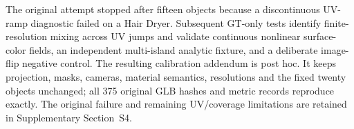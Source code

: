 \documentclass[times,twocolumn,final]{elsarticle}
\providecommand{\DIFadd}[1]{{\protect\color{blue} \sf #1}} %
\providecommand{\DIFaddbegin}{} %
\providecommand{\DIFaddend}{} %
\providecommand{\DIFdelbegin}{} %
\providecommand{\DIFdelend}{} %
\begin{document}
\DIFdelbegin %
\DIFdelend \DIFaddbegin \DIFadd{The original attempt stopped after fifteen objects because a discontinuous UV-ramp diagnostic failed on a Hair Dryer. Subsequent GT-only tests identify finite-resolution mixing across UV jumps and validate continuous nonlinear surface-color fields, an independent multi-island analytic fixture, and a deliberate image-flip negative control. The resulting calibration addendum is post hoc. It keeps projection, masks, cameras, material semantics, resolutions and the fixed twenty objects unchanged; all 375 original GLB hashes and metric records reproduce exactly. The original failure and remaining UV/coverage limitations are retained in Supplementary Section~S4.
}\DIFaddend 
\end{document}
